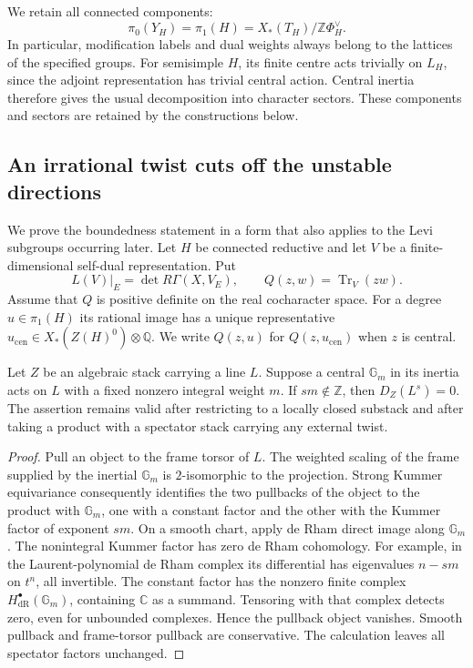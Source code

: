 We retain all connected components:
\begin{equation}\label{foundations:components}
 \pi_0(Y_H)=\pi_1(H)
 =X_*(T_H)/\mathbb Z\Phi_H^\vee.
\end{equation}
In particular, modification labels and dual weights always belong to the
lattices of the specified groups.  For semisimple $H$, its finite centre
acts trivially on $L_H$, since the adjoint representation has trivial
central action.  Central inertia therefore gives the usual decomposition
into character sectors.  These components and sectors are retained by the
constructions below.

\subsection{An irrational twist cuts off the unstable directions}

We prove the boundedness statement in a form that also applies to the
Levi subgroups occurring later.  Let $H$ be connected reductive and let
$V$ be a finite-dimensional self-dual representation.  Put
\[
 L(V)|_E=\det R\Gamma(X,V_E),\qquad
 Q(z,w)=\operatorname{Tr}_V(zw).
\]
Assume that $Q$ is positive definite on the real cocharacter space.
For a degree $u\in\pi_1(H)$ its rational image has a unique representative
$u_{\mathrm{cen}}\in X_*(Z(H)^0)\otimes\mathbb Q$.  We write $Q(z,u)$
for $Q(z,u_{\mathrm{cen}})$ when $z$ is central.

\begin{lemma}\label{foundations:inertia}
Let $Z$ be an algebraic stack carrying a line $L$.  Suppose a central
$\mathbb G_m$ in its inertia acts on $L$ with a fixed nonzero integral
weight $m$.  If $sm\notin\mathbb Z$, then $D_Z(L^s)=0$.
The assertion remains valid after restricting to a locally closed
substack and after taking a product with a spectator stack carrying any
external twist.
\end{lemma}

\begin{proof}
Pull an object to the frame torsor of $L$.  The weighted scaling of the
frame supplied by the inertial $\mathbb G_m$ is $2$-isomorphic to the
projection.  Strong Kummer equivariance consequently identifies the two
pullbacks of the object to the product with $\mathbb G_m$, one with a
constant factor and the other with the Kummer factor of exponent $sm$.
On a smooth chart, apply de Rham direct image along $\mathbb G_m$.
The nonintegral Kummer factor has zero de Rham cohomology.  For example,
in the Laurent-polynomial de Rham complex its differential has eigenvalues
$n-sm$ on $t^n$, all invertible.  The constant factor has the nonzero finite
complex $H^\bullet_{\mathrm{dR}}(\mathbb G_m)$, containing $\mathbb C$ as a
summand.  Tensoring with that complex detects zero, even for unbounded
complexes.  Hence the pullback object vanishes.  Smooth pullback and
frame-torsor pullback are conservative.  The calculation leaves all
spectator factors unchanged.
\end{proof}

